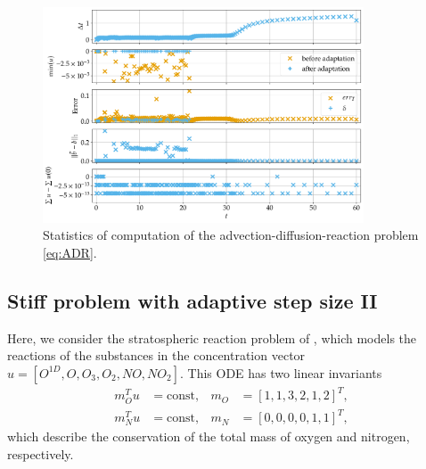 \documentclass[a4paper]{article}
\numberwithin{equation}{section}
\theoremstyle{plain}
\theoremstyle{definition}
\numberwithin{theorem}{section}
\newcommand{\1}{\mathbbm{1}}
\begin{document}
\begin{figure}
\centering
\includegraphics[width=0.85\textwidth]{plots/ADP_stepsize_b.pdf}
\caption{Statistics of computation of the advection-diffusion-reaction problem \eqref{eq:ADR}.}
\label{fig:Stats_ADP}
\end{figure}


\subsection{Stiff problem with adaptive step size II}

Here, we consider the stratospheric reaction problem of
\cite{sandu2001positive}, which models the reactions of the substances
in the concentration vector $u = [O^{1D}, O, O_3, O_2, NO, NO_2]$.
This ODE has two linear invariants
\begin{align}
  m_O^T u &= \text{const}, & m_O &= [1,1,3,2,1,2]^T, \\
  m_N^T u &= \text{const}, & m_N &= [0,0,0,0,1,1]^T,
\end{align}
which describe the conservation of the total mass of oxygen and nitrogen,
respectively.
\end{document}
